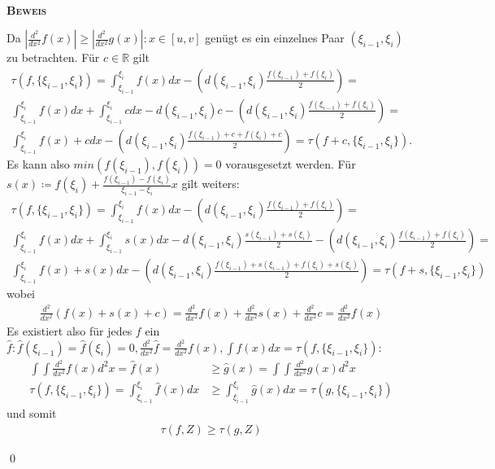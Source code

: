 \documentclass[12pt,a4paper]{scrartcl}
\numberwithin{equation}{section}
\numberwithin{myalgctr}{section}
\numberwithin{mytheoremctr}{subsection}
\numberwithin{mykorollarctr}{subsection}
\numberwithin{mylemmactr}{subsection}
\numberwithin{mybeispielctr}{subsection}
\newenvironment{myproof}{%
	\bigskip\noindent%
	\textsc{\textbf{\\Beweis\\}}%
	\indent
}{\qed\par\bigskip}  %
\begin{document}
	\begin{myproof}
		Da $|\frac{d^2}{dx^2}f(x)|\geq |\frac{d^2}{dx^2}g(x)|:x\in [u,v]$ gen\"ugt es ein einzelnes Paar $(\xi_{i-1},\xi_i)$ zu betrachten. F\"ur $c\in\mathbb{R}$ gilt 
		\begin{gather*}
		\tau(f,\{\xi_{i-1},\xi_i\}) = \int_{\xi_{i-1}}^{\xi_i}f(x)dx - \left(d(\xi_{i-1},\xi_i)\frac{f(\xi_{i-1})+f(\xi_i)}{2}\right) =\\
		\int_{\xi_{i-1}}^{\xi_i}f(x)dx + \int_{\xi_{i-1}}^{\xi_i}cdx - d(\xi_{i-1},\xi_i)c - \left(d(\xi_{i-1},\xi_i)\frac{f(\xi_{i-1})+f(\xi_i)}{2}\right) = \\
		\int_{\xi_{i-1}}^{\xi_i}f(x) + cdx  - \left(d(\xi_{i-1},\xi_i)\frac{f(\xi_{i-1})+c+f(\xi_i)+c}{2}\right) = \tau(f+c,\{\xi_{i-1},\xi_i\}).
		\end{gather*}
		Es kann also $min(f(\xi_{i-1}),f(\xi_{i})) = 0$ vorausgesetzt werden. F\"ur $s(x)\coloneqq f(\xi_{i}) + \frac{f(\xi_{i-1}) - f(\xi_{i})}{\xi_{i-1} - \xi_{i}}x$ gilt weiters:
		\begin{gather*}
		\tau(f,\{\xi_{i-1},\xi_i\}) = \int_{\xi_{i-1}}^{\xi_i}f(x)dx - \left(d(\xi_{i-1},\xi_i)\frac{f(\xi_{i-1})+f(\xi_i)}{2}\right) =\\
		\int_{\xi_{i-1}}^{\xi_i}f(x)dx + \int_{\xi_{i-1}}^{\xi_i}s(x)dx - d(\xi_{i-1},\xi_i)\frac{s(\xi_{i-1})+s(\xi_i)}{2} - \left(d(\xi_{i-1},\xi_i)\frac{f(\xi_{i-1})+f(\xi_i)}{2}\right) = \\
		\int_{\xi_{i-1}}^{\xi_i}f(x) + s(x)dx  - \left(d(\xi_{i-1},\xi_i)\frac{f(\xi_{i-1})+s(\xi_{i-1})+f(\xi_i)+s(\xi_i)}{2}\right) = \tau(f+s,\{\xi_{i-1},\xi_i\})
		\end{gather*} wobei 
		\begin{align*}
		\frac{d^2}{dx^2} (f(x) + s(x) + c) = \frac{d^2}{dx^2}f(x) + \frac{d^2}{dx^2}s(x) + \frac{d^2}{dx^2}c= \frac{d^2}{dx^2}f(x)
		\end{align*}
		Es existiert also f\"ur jedes $f$  ein  $\hat{f}:\hat{f}(\xi_{i-1}) = \hat{f}(\xi_{i}) = 0,\frac{d^2}{dx^2}\hat{f} = \frac{d^2}{dx^2}f(x),\int\hat{f}(x)dx = \tau(f,\{\xi_{i-1},\xi_i\})$:
		\begin{align*}
		\int\int \frac{d^2}{dx^2}f(x)d^2x = \hat{f}(x) &\geq \hat{g}(x) = \int\int \frac{d^2}{dx^2}g(x)d^2x\\
		\tau(f,\{\xi_{i-1},\xi_i\}) = \int_{\xi_{i-1}}^{\xi_{i}}\hat{f}(x)dx&\geq \int_{\xi_{i-1}}^{\xi_{i}}\hat{g}(x)dx = \tau(g,\{\xi_{i-1},\xi_i\})
		\end{align*}
		und somit
		\begin{align*}
		\tau(f,Z)\geq\tau(g,Z)
		\end{align*}
		
	\end{myproof}
	
\end{document}

